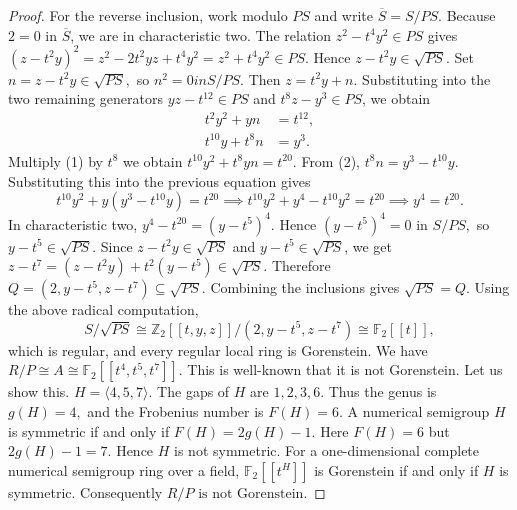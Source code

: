 \documentclass[10pt,a4paper]{amsart}
\begin{document}
\begin{proof}
For the reverse inclusion, work modulo \(PS\) and write
\(
\overline{S}=S/PS.
\)
Because \(2=0\) in \(\overline S\), we are in characteristic two.
The relation
\(
z^2-t^4y^2\in PS
\)
gives
\(
(z-t^2y)^2
=
z^2-2t^2yz+t^4y^2
=
z^2+t^4y^2
\in PS.
\)
Hence
\(
z-t^2y\in\sqrt{PS}.
\)
Set
$
n=z-t^2y\in\sqrt{PS},$
so 
$n^2=0 { in } S/PS.$
Then \(z=t^2y+n\). Substituting into the two remaining generators
\(yz-t^{12}\in PS\) and \(t^8z-y^3\in PS\), we obtain
\begin{align}
t^2y^2+yn &= t^{12}, \tag{1}\\
t^{10}y+t^8n &= y^3. \tag{2}
\end{align}
Multiply (1) by \(t^8\) we obtain
\(
t^{10}y^2+t^8yn=t^{20}.
\)
From (2),
\(
t^8n=y^3-t^{10}y.
\)
Substituting this into the previous equation gives
\[
t^{10}y^2+y(y^3-t^{10}y)=t^{20}
\implies
t^{10}y^2+y^4-t^{10}y^2=t^{20}
\implies
y^4=t^{20}.
\]
In characteristic two,
\(
y^4-t^{20}=(y-t^5)^4.
\)
Hence
\(
(y-t^5)^4=0
 \text{ in }S/PS,
\)
so
\(
y-t^5\in\sqrt{PS}.
\)
Since \(z-t^2y\in\sqrt{PS}\) and \(y-t^5\in\sqrt{PS}\), we get
\(
z-t^7
=
(z-t^2y)+t^2(y-t^5)
\in\sqrt{PS}.
\)
Therefore
\(
Q=(2,y-t^5,z-t^7)\subseteq\sqrt{PS}.
\)
Combining the inclusions gives
\({\sqrt{PS}=Q.}
\)
Using the above radical computation,
\[
S/\sqrt{PS}
\cong
\mathbb Z_2[[t,y,z]]/(2,y-t^5,z-t^7)
\cong
\mathbb F_2[[t]],
\]
which is regular, and every regular local ring is Gorenstein.
 We have
 \(
 R/P\cong A\cong\mathbb F_2[[t^4,t^5,t^7]].
 \)
 This is well-known that it is not Gorenstein.
 Let us show this.
 \(
 H=\langle4,5,7\rangle.
 \)
 The gaps of $H$ are
 \(
 1,2,3,6.
 \)
 Thus the genus is
 \(
 g(H)=4,
 \)
 and the Frobenius number is
 \(
 F(H)=6.
 \)
 A numerical semigroup $H$ is symmetric if and only if
 \(
 F(H)=2g(H)-1.
 \)
 Here
 \(
 F(H)=6 \)
 {but}
 \( 2g(H)-1=7.
 \)
 Hence $H$ is not symmetric.
 For a one-dimensional complete numerical semigroup ring over a field,
 \(
 \mathbb F_2[[t^H]]
 \)
 is Gorenstein if and only if $H$ is symmetric. 
 Consequently
 \(
 {R/P\text{ is not Gorenstein}.}
 \)
 \end{proof}
\end{document}
